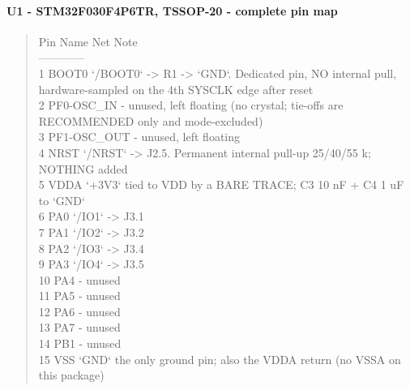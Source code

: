 \documentclass[11pt,a4paper]{article}
\begin{document}
\paragraph*{U1 - STM32F030F4P6TR, TSSOP-20 - complete pin map}
\begin{quote}\small\ttfamily\raggedright
\textbar{} Pin \textbar{} Name \textbar{} Net \textbar{} Note \textbar{}\\
\textbar{}---\textbar{}---\textbar{}---\textbar{}---\textbar{}\\
\textbar{} 1 \textbar{} BOOT0 \textbar{} `/BOOT0` \textbar{} -\textgreater{} R1 -\textgreater{} `GND`. Dedicated pin, NO internal pull, hardware-sampled on the 4th SYSCLK edge after reset \textbar{}\\
\textbar{} 2 \textbar{} PF0-OSC\_IN \textbar{} - \textbar{} unused, left floating (no crystal; tie-offs are RECOMMENDED only and mode-excluded) \textbar{}\\
\textbar{} 3 \textbar{} PF1-OSC\_OUT \textbar{} - \textbar{} unused, left floating \textbar{}\\
\textbar{} 4 \textbar{} NRST \textbar{} `/NRST` \textbar{} -\textgreater{} J2.5. Permanent internal pull-up 25/40/55 k; NOTHING added \textbar{}\\
\textbar{} 5 \textbar{} VDDA \textbar{} `+3V3` \textbar{} tied to VDD by a BARE TRACE; C3 10 nF + C4 1 uF to `GND` \textbar{}\\
\textbar{} 6 \textbar{} PA0 \textbar{} `/IO1` \textbar{} -\textgreater{} J3.1 \textbar{}\\
\textbar{} 7 \textbar{} PA1 \textbar{} `/IO2` \textbar{} -\textgreater{} J3.2 \textbar{}\\
\textbar{} 8 \textbar{} PA2 \textbar{} `/IO3` \textbar{} -\textgreater{} J3.4 \textbar{}\\
\textbar{} 9 \textbar{} PA3 \textbar{} `/IO4` \textbar{} -\textgreater{} J3.5 \textbar{}\\
\textbar{} 10 \textbar{} PA4 \textbar{} - \textbar{} unused \textbar{}\\
\textbar{} 11 \textbar{} PA5 \textbar{} - \textbar{} unused \textbar{}\\
\textbar{} 12 \textbar{} PA6 \textbar{} - \textbar{} unused \textbar{}\\
\textbar{} 13 \textbar{} PA7 \textbar{} - \textbar{} unused \textbar{}\\
\textbar{} 14 \textbar{} PB1 \textbar{} - \textbar{} unused \textbar{}\\
\textbar{} 15 \textbar{} VSS \textbar{} `GND` \textbar{} the only ground pin; also the VDDA return (no VSSA on this package) \textbar{}\\

\end{quote}
\end{document}

